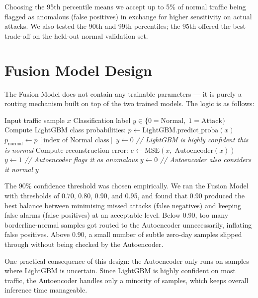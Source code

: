 \documentclass[12pt,a4paper]{report}
\begin{document}
\noindent Choosing the 95th percentile means we accept up to 5\% of normal
traffic being flagged as anomalous (false positives) in exchange for higher
sensitivity on actual attacks. We also tested the 90th and 99th percentiles;
the 95th offered the best trade-off on the held-out normal validation set.

\section{Fusion Model Design}

The Fusion Model does not contain any trainable parameters — it is purely a
routing mechanism built on top of the two trained models. The logic is as follows:

\begin{algorithm}[H]
\caption{Fusion Model Decision Logic}
\label{alg:fusion}
\begin{algorithmic}[1]
\Require Input traffic sample $x$
\Ensure Classification label $y \in \{0=\text{Normal},\; 1=\text{Attack}\}$
\State Compute LightGBM class probabilities: $p \leftarrow \text{LightGBM.predict\_proba}(x)$
\State $p_{\text{normal}} \leftarrow p\,[\text{index of Normal class}]$
    \State $y \leftarrow 0$ \quad \textit{// LightGBM is highly confident this is normal}
\Else
    \State Compute reconstruction error: $e \leftarrow \text{MSE}(x,\; \text{Autoencoder}(x))$
        \State $y \leftarrow 1$ \quad \textit{// Autoencoder flags it as anomalous}
    \Else
        \State $y \leftarrow 0$ \quad \textit{// Autoencoder also considers it normal}
    \EndIf
\EndIf
\Return $y$
\end{algorithmic}
\end{algorithm}

\noindent The 90\% confidence threshold was chosen empirically. We ran the Fusion
Model with thresholds of 0.70, 0.80, 0.90, and 0.95, and found that 0.90 produced
the best balance between minimising missed attacks (false negatives) and keeping
false alarms (false positives) at an acceptable level. Below 0.90, too many
borderline-normal samples got routed to the Autoencoder unnecessarily, inflating
false positives. Above 0.90, a small number of subtle zero-day samples slipped
through without being checked by the Autoencoder.

\noindent One practical consequence of this design: the Autoencoder only runs on
samples where LightGBM is uncertain. Since LightGBM is highly confident on most
traffic, the Autoencoder handles only a minority of samples, which keeps overall
inference time manageable.
\end{document}
